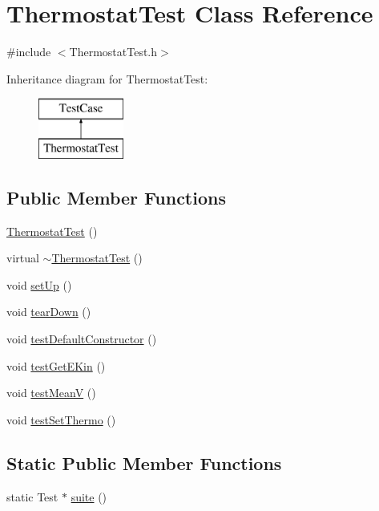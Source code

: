 \hypertarget{classThermostatTest}{\section{Thermostat\-Test Class Reference}
\label{classThermostatTest}
}


{\ttfamily \#include $<$Thermostat\-Test.\-h$>$}

Inheritance diagram for Thermostat\-Test\-:\begin{figure}[H]
\begin{center}
\leavevmode
\includegraphics[height=2.000000cm]{classThermostatTest}
\end{center}
\end{figure}
\subsection*{Public Member Functions}
\begin{DoxyCompactItemize}
\item 
\hyperlink{classThermostatTest_ad94e00a85b238de4af9c2f4c5a69e5d3}{Thermostat\-Test} ()
\item 
virtual \hyperlink{classThermostatTest_a88e2ecd8828ff3594f082f76c18f8fbf}{$\sim$\-Thermostat\-Test} ()
\item 
void \hyperlink{classThermostatTest_a7976b8d7def04b6eccde6ff4736e9946}{set\-Up} ()
\item 
void \hyperlink{classThermostatTest_a435da4217dd44255d1f76cdfc1320a9f}{tear\-Down} ()
\item 
void \hyperlink{classThermostatTest_a98768aed0f99becbc3b0f1459f115626}{test\-Default\-Constructor} ()
\item 
void \hyperlink{classThermostatTest_aff27d37c404ecb05ace856389fa09c63}{test\-Get\-E\-Kin} ()
\item 
void \hyperlink{classThermostatTest_afc34add8ce998672f815fb51c34635f2}{test\-Mean\-V} ()
\item 
void \hyperlink{classThermostatTest_a0c9e9d35a6253607e2c43ac666857989}{test\-Set\-Thermo} ()
\end{DoxyCompactItemize}
\subsection*{Static Public Member Functions}
\begin{DoxyCompactItemize}
\item 
static Test $\ast$ \hyperlink{classThermostatTest_ac9e3485b6655fca945ada2eedaf3bcb3}{suite} ()
\end{DoxyCompactItemize}
